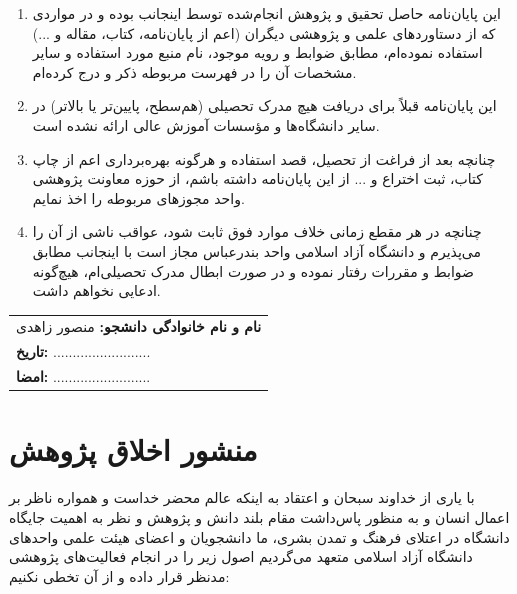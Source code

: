 \documentclass[a4paper,12pt]{report}
\renewcommand{\%}{\lr{\oldpercent}}
\begin{document}
\begin{enumerate}
    \item این پایان‌نامه حاصل تحقیق و پژوهش انجام‌شده توسط اینجانب بوده و در مواردی که از دستاوردهای علمی و پژوهشی دیگران (اعم از پایان‌نامه، کتاب، مقاله و ...) استفاده نموده‌ام، مطابق ضوابط و رویه موجود، نام منبع مورد استفاده و سایر مشخصات آن را در فهرست مربوطه ذکر و درج کرده‌ام.
    \item این پایان‌نامه قبلاً برای دریافت هیچ مدرک تحصیلی (هم‌سطح، پایین‌تر یا بالاتر) در سایر دانشگاه‌ها و مؤسسات آموزش عالی ارائه نشده است.
    \item چنانچه بعد از فراغت از تحصیل، قصد استفاده و هرگونه بهره‌برداری اعم از چاپ کتاب، ثبت اختراع و ... از این پایان‌نامه داشته باشم، از حوزه معاونت پژوهشی واحد مجوزهای مربوطه را اخذ نمایم.
    \item چنانچه در هر مقطع زمانی خلاف موارد فوق ثابت شود، عواقب ناشی از آن را می‌پذیرم و دانشگاه آزاد اسلامی واحد بندرعباس مجاز است با اینجانب مطابق ضوابط و مقررات رفتار نموده و در صورت ابطال مدرک تحصیلی‌ام، هیچ‌گونه ادعایی نخواهم داشت.
\end{enumerate}

\vspace{1cm}

\begin{flushleft}
\begin{tabular}{l}
\textbf{نام و نام خانوادگی دانشجو:} منصور زاهدی \\
\textbf{تاریخ:} ......................... \\
\textbf{امضا:} ......................... \\
\end{tabular}
\end{flushleft}

\newpage
\chapter*{منشور اخلاق پژوهش}

با یاری از خداوند سبحان و اعتقاد به اینکه عالم محضر خداست و همواره ناظر بر اعمال انسان و به منظور پاس‌داشت مقام بلند دانش و پژوهش و نظر به اهمیت جایگاه دانشگاه در اعتلای فرهنگ و تمدن بشری، ما دانشجویان و اعضای هیئت علمی واحدهای دانشگاه آزاد اسلامی متعهد می‌گردیم اصول زیر را در انجام فعالیت‌های پژوهشی مدنظر قرار داده و از آن تخطی نکنیم:
\end{document}
